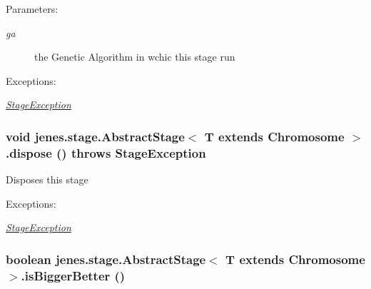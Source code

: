 \begin{Desc}
\item[Parameters:]
\begin{description}
\item[{\em ga}]the Genetic Algorithm in wchic this stage run \end{description}
\end{Desc}
\begin{Desc}
\item[Exceptions:]
\begin{description}
\item[{\em \hyperlink{classjenes_1_1stage_1_1_stage_exception}{StageException}}]\end{description}
\end{Desc}
\hypertarget{classjenes_1_1stage_1_1_abstract_stage_3_01_t_01extends_01_chromosome_01_4_68d4104c004b50abf7b12ffc94122ddc}{
\subsubsection[dispose]{\setlength{\rightskip}{0pt plus 5cm}void jenes.stage.AbstractStage$<$ T extends Chromosome $>$.dispose ()  throws {\bf StageException} }}
\label{classjenes_1_1stage_1_1_abstract_stage_3_01_t_01extends_01_chromosome_01_4_68d4104c004b50abf7b12ffc94122ddc}


Disposes this stage

\begin{Desc}
\item[Exceptions:]
\begin{description}
\item[{\em \hyperlink{classjenes_1_1stage_1_1_stage_exception}{StageException}}]\end{description}
\end{Desc}
\hypertarget{classjenes_1_1stage_1_1_abstract_stage_3_01_t_01extends_01_chromosome_01_4_c20363682ebc9214d9253ff157a06a2d}{
\subsubsection[isBiggerBetter]{\setlength{\rightskip}{0pt plus 5cm}boolean jenes.stage.AbstractStage$<$ T extends Chromosome $>$.isBiggerBetter ()}}
\label{classjenes_1_1stage_1_1_abstract_stage_3_01_t_01extends_01_chromosome_01_4_c20363682ebc9214d9253ff157a06a2d}


